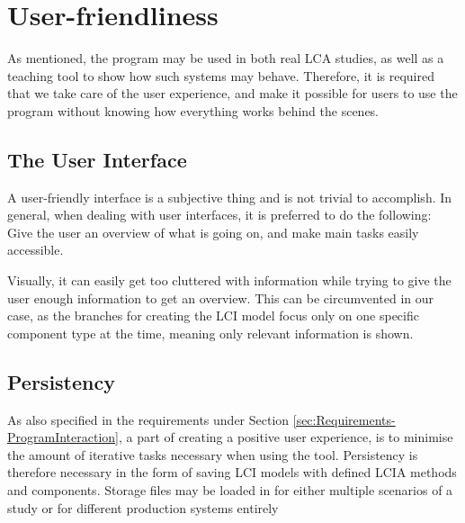 \section{User-friendliness}\label{sec:Design-UserFriendliness}
As mentioned, the program may be used in both real LCA studies, as well as a teaching tool to show how such systems may behave. Therefore, it is required that we take care of the user experience, and make it possible for users to use the program without knowing how everything works behind the scenes.

\subsection{The User Interface} \label{ssec:Design-UserInterface}
A user-friendly interface is a subjective thing and is not trivial to accomplish. In general, when dealing with user interfaces, it is preferred to do the following: Give the user an overview of what is going on, and make main tasks easily accessible.

Visually, it can easily get too cluttered with information while trying to give the user enough information to get an overview. This can be circumvented in our case, as the branches for creating the LCI model focus only on one specific component type at the time, meaning only relevant information is shown.

\subsection{Persistency} \label{ssec:Design-Persistency}
As also specified in the requirements under Section \ref{sec:Requirements-ProgramInteraction}, a part of creating a positive user experience, is to minimise the amount of iterative tasks necessary when using the tool. Persistency is therefore necessary in the form of saving LCI models with defined LCIA methods and components. Storage files may be loaded in for either multiple scenarios of a study or for different production systems entirely